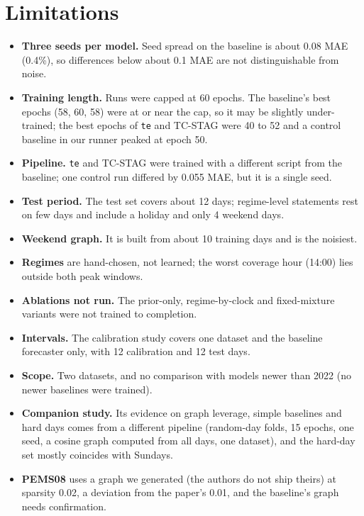 \documentclass[conference]{IEEEtran}
\begin{document}
\section{Limitations}
\begin{itemize}
\item \textbf{Three seeds per model.} Seed spread on the baseline is about 0.08 MAE (0.4\%), so differences below about 0.1 MAE are not distinguishable from noise.
\item \textbf{Training length.} Runs were capped at 60 epochs. The baseline's best epochs (58, 60, 58) were at or near the cap, so it may be slightly under-trained; the best epochs of \texttt{te} and TC-STAG were 40 to 52 and a control baseline in our runner peaked at epoch 50.
\item \textbf{Pipeline.} \texttt{te} and TC-STAG were trained with a different script from the baseline; one control run differed by 0.055 MAE, but it is a single seed.
\item \textbf{Test period.} The test set covers about 12 days; regime-level statements rest on few days and include a holiday and only 4 weekend days.
\item \textbf{Weekend graph.} It is built from about 10 training days and is the noisiest.
\item \textbf{Regimes} are hand-chosen, not learned; the worst coverage hour (14:00) lies outside both peak windows.
\item \textbf{Ablations not run.} The prior-only, regime-by-clock and fixed-mixture variants were not trained to completion.
\item \textbf{Intervals.} The calibration study covers one dataset and the baseline forecaster only, with 12 calibration and 12 test days.
\item \textbf{Scope.} Two datasets, and no comparison with models newer than 2022 (no newer baselines were trained).
\item \textbf{Companion study.} Its evidence on graph leverage, simple baselines and hard days comes from a different pipeline (random-day folds, 15 epochs, one seed, a cosine graph computed from all days, one dataset), and the hard-day set mostly coincides with Sundays.
\item \textbf{PEMS08} uses a graph we generated (the authors do not ship theirs) at sparsity 0.02, a deviation from the paper's 0.01, and the baseline's graph needs confirmation.
\end{itemize}
\end{document}
